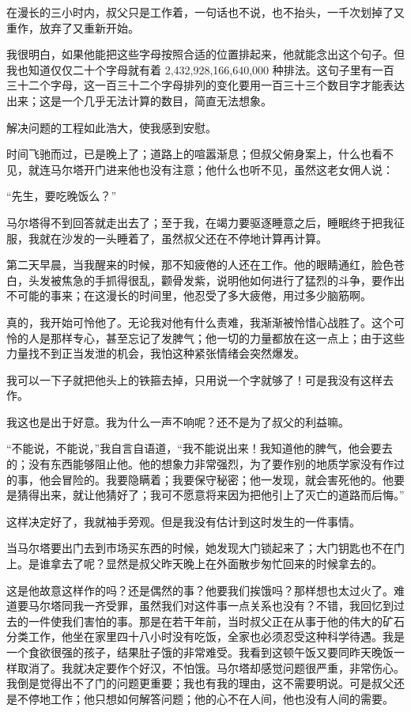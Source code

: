 \documentclass[10pt]{book}
\begin{document}
在漫长的三小时内，叔父只是工作着，一句话也不说，也不抬头，一千次划掉了又重作，放弃了又重新开始。

我很明白，如果他能把这些字母按照合适的位置排起来，他就能念出这个句子。但我也知道仅仅二十个字母就有着 2,432,928,166,640,000 种排法。这句子里有一百三十二个字母，这一百三十二个字母排列的变化要用一百三十三个数目字才能表达出来；这是一个几乎无法计算的数目，简直无法想象。

解决问题的工程如此浩大，使我感到安慰。

时间飞驰而过，已是晚上了；道路上的喧嚣渐息；但叔父俯身案上，什么也看不见，就连马尔塔开门进来他也没有注意；他什么也听不见，虽然这老女佣人说：

“先生，要吃晚饭么？”

马尔塔得不到回答就走出去了；至于我，在竭力要驱逐睡意之后，睡眠终于把我征服，我就在沙发的一头睡着了，虽然叔父还在不停地计算再计算。

第二天早晨，当我醒来的时候，那不知疲倦的人还在工作。他的眼睛通红，脸色苍白，头发被焦急的手抓得很乱，颧骨发紫，说明他如何进行了猛烈的斗争，要作出不可能的事来；在这漫长的时间里，他忍受了多大疲倦，用过多少脑筋啊。

真的，我开始可怜他了。无论我对他有什么责难，我渐渐被怜惜心战胜了。这个可怜的人是那样专心，甚至忘记了发脾气；他一切的力量都放在这一点上；由于这些力量找不到正当发泄的机会，我怕这种紧张情绪会突然爆发。

我可以一下子就把他头上的铁箍去掉，只用说一个字就够了！可是我没有这样去作。

我这也是出于好意。我为什么一声不响呢？还不是为了叔父的利益嘛。

“不能说，不能说，”我自言自语道，“我不能说出来！我知道他的脾气，他会要去的；没有东西能够阻止他。他的想象力非常强烈，为了要作别的地质学家没有作过的事，他会冒险的。我要隐瞒着；我要保守秘密；他一发现，就会害死他的。他要是猜得出来，就让他猜好了；我可不愿意将来因为把他引上了灭亡的道路而后悔。”

这样决定好了，我就袖手旁观。但是我没有估计到这时发生的一件事情。

当马尔塔要出门去到市场买东西的时候，她发现大门锁起来了；大门钥匙也不在门上。是谁拿去了呢？显然是叔父昨天晚上在外面散步匆忙回来的时候拿去的。

这是他故意这样作的吗？还是偶然的事？他要我们挨饿吗？那样想也太过火了。难道要马尔塔同我一齐受罪，虽然我们对这件事一点关系也没有？不错，我回忆到过去的一件使我们害怕的事。那是在若干年前，当时叔父正在从事于他的伟大的矿石分类工作，他坐在家里四十八小时没有吃饭，全家也必须忍受这种科学待遇。我是一个食欲很强的孩子，结果肚子饿的非常难受。我看到这顿午饭又要同昨天晚饭一样取消了。我就决定要作个好汉，不怕饿。马尔塔却感觉问题很严重，非常伤心。我倒是觉得出不了门的问题更重要；我也有我的理由，这不需要明说。可是叔父还是不停地工作；他只想如何解答问题；他的心不在人间，他也没有人间的需要。
\end{document}
